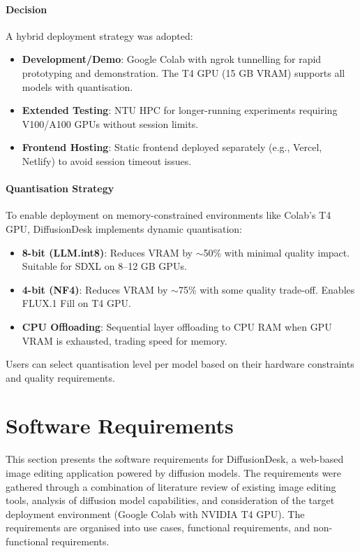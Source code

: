 \documentclass[12pt,a4paper]{report}
\begin{document}
\paragraph{Decision}

A hybrid deployment strategy was adopted:
\begin{itemize}
    \item \textbf{Development/Demo}: Google Colab with ngrok tunnelling for rapid prototyping and demonstration. The T4 GPU (15 GB VRAM) supports all models with quantisation.
    \item \textbf{Extended Testing}: NTU HPC for longer-running experiments requiring V100/A100 GPUs without session limits.
    \item \textbf{Frontend Hosting}: Static frontend deployed separately (e.g., Vercel, Netlify) to avoid session timeout issues.
\end{itemize}

\paragraph{Quantisation Strategy}

To enable deployment on memory-constrained environments like Colab's T4 GPU, DiffusionDesk implements dynamic quantisation:
\begin{itemize}
    \item \textbf{8-bit (LLM.int8)}: Reduces VRAM by $\sim$50\% with minimal quality impact. Suitable for SDXL on 8--12 GB GPUs.
    \item \textbf{4-bit (NF4)}: Reduces VRAM by $\sim$75\% with some quality trade-off. Enables FLUX.1 Fill on T4 GPU.
    \item \textbf{CPU Offloading}: Sequential layer offloading to CPU RAM when GPU VRAM is exhausted, trading speed for memory.
\end{itemize}

Users can select quantisation level per model based on their hardware constraints and quality requirements.

\newpage

\section{Software Requirements}

This section presents the software requirements for DiffusionDesk, a web-based image editing application powered by diffusion models. The requirements were gathered through a combination of literature review of existing image editing tools, analysis of diffusion model capabilities, and consideration of the target deployment environment (Google Colab with NVIDIA T4 GPU). The requirements are organised into use cases, functional requirements, and non-functional requirements.
\end{document}
